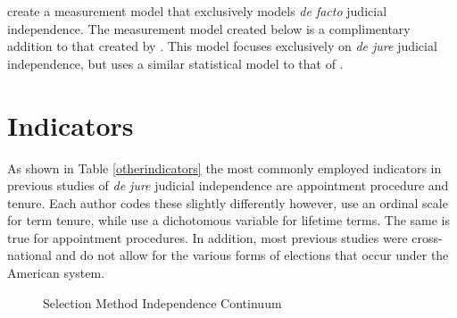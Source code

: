 \documentclass[12pt]{article}
\begin{document}
\citet*{Linzer2014} create a measurement model that exclusively models \textit{de facto} judicial independence.  The measurement model created below is a complimentary addition to that created by \citeauthor{Linzer2014}.  This model focuses exclusively on \textit{de jure} judicial independence, but uses a similar statistical model to that of \citeauthor{Linzer2014}.  

\section{Indicators}\label{Indicators}
As shown in Table \ref{otherindicators} the most commonly employed indicators in previous studies of \textit{de jure} judicial independence are appointment procedure and tenure.  Each author codes these slightly differently however, \citet{Feld2003} use an ordinal scale for term tenure, while \citet{Melton2014} use a dichotomous variable for lifetime terms.  The same is true for appointment procedures.  In addition, most previous studies were cross-national and do not allow for the various forms of elections that occur under the American system.    

\begin{figure}[tbh]\centering\caption{Selection Method Independence Continuum}\label{selectioncontinuum}
\end{figure} 
\end{document}
